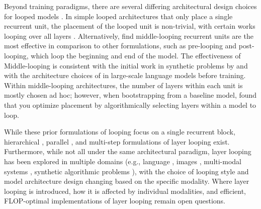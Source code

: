 Beyond training paradigms, there are several differing architectural design choices for looped models \citep{geiping_scaling_2025,bansalEndtoendAlgorithmSynthesis2022, saunshiReasoningLatentThoughts2025b}. In simple looped architectures that only place a single recurrent unit, the placement of the looped unit is non-trivial, with certain works looping over all layers \citep{dehghaniUniversalTransformers2019,Csordas2024MoEUTMU,Bae2024RelaxedRT}. Alternatively, \citet{saunshiReasoningLatentThoughts2025b} find middle-looping recurrent units are the most effective in comparison to other formulations, such as pre-looping and post-looping, which loop the beginning and end of the model. The effectiveness of Middle-looping is consistent with the initial work in synthetic problems by \citet{bansalEndtoendAlgorithmSynthesis2022, avi_learn_algorithm} and with the architecture choices of \citet{geiping_scaling_2025,mcleish_retrofitted_recurrence} in large-scale language models before training. Within middle-looping architectures, the number of layers within each unit is mostly chosen ad hoc; however, when bootstrapping from a baseline model, \citet{koishekenov2025encodethinkdecodescaling} found that you optimize placement by algorithmically selecting layers within a model to loop.

While these prior formulations of looping focus on a single recurrent block, hierarchical \citep{wangHierarchicalReasoningModel2025b,jolicoeur-martineauLessMoreRecursive2025}, parallel \citep{wu2025parallellooptransformerefficient}, and multi-step \citep{jacobs2026blockrecurrentdynamicsvisiontransformers} formulations of layer looping exist. Furthermore, while not all under the same architectural paradigm, layer looping has been explored in multiple domains (e.g., language \citep{geiping_scaling_2025,mcleish_retrofitted_recurrence}, images \citep{jacobs2026blockrecurrentdynamicsvisiontransformers}, multi-modal systems \citep{alabdulmohsin2025recursiveinferencescalingwinning}, synthetic algorithmic problems \citep{avi_learn_algorithm,bansalEndtoendAlgorithmSynthesis2022,yangLoopedTransformersAre2023}), with the choice of looping style and model architecture design changing based on the specific modality. Where layer looping is introduced, how it is affected by individual modalities, and efficient, FLOP-optimal implementations of layer looping remain open questions.

